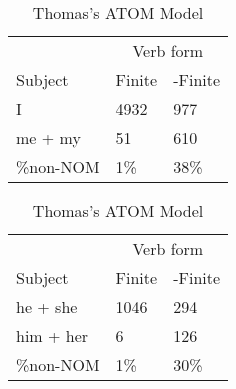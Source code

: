 \begin{table}[]
    \caption{Thomas's ATOM Model}
    \begin{minipage}{0.5\textwidth}
    \centering
    \begin{tabular}{@{}lll@{}}
        \toprule
         &\multicolumn{2}{c}{Verb form}\\
         \cline{2-3}
        Subject & Finite & -Finite \\
        \midrule
        I & 4932 & 977 \\
        me + my & 51 & 610 \\
        \hline
        \%non-NOM & 1\% & 38\% \\
        \bottomrule
    \end{tabular}
\end{minipage}
\begin{minipage}{0.5\textwidth}
    \centering
    \begin{tabular}{@{}lll@{}}
        \toprule
         &\multicolumn{2}{c}{Verb form}\\
         \cline{2-3}
        Subject & Finite & -Finite \\
        \midrule
        he + she & 1046 & 294 \\
        him + her & 6 & 126 \\
        \hline
        \%non-NOM & 1\% & 30\% \\
        \bottomrule
    \end{tabular}
    \end{minipage}
    \begin{minipage}{0.5\textwidth}
    

\end{minipage}
\end{table}
